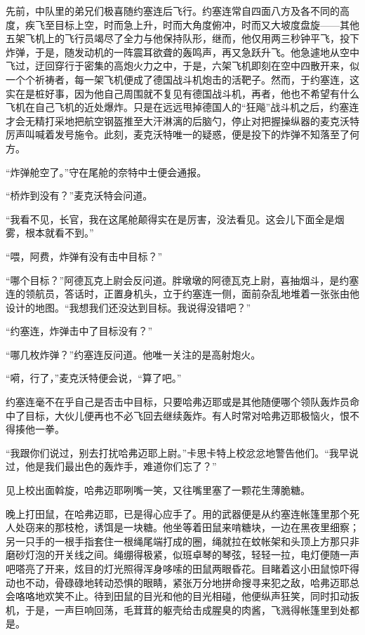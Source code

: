     先前，中队里的弟兄们极喜随约塞连后飞行。约塞连常自四面八方及各不同的高度，疾飞至目标上空，时而急上升，时而大角度俯冲，时而又大坡度盘旋——其他五架飞机上的飞行员竭尽了全力与他保持队形，继而，他仅用两三秒钟平飞，投下炸弹，于是，随发动机的一阵震耳欲聋的轰鸣声，再又急跃升飞。他急遽地从空中飞过，迂回穿行于密集的高炮火力之中，于是，六架飞机即刻在空中四散开来，似一个个祈祷者，每一架飞机便成了德国战斗机炮击的活靶子。然而，于约塞连，这实在是桩好事，因为他自己周围就不复见有德国战斗机，再者，他也不希望有什么飞机在自己飞机的近处爆炸。只是在远远甩掉德国人的“狂飚”战斗机之后，约塞连才会无精打采地把航空钢盔推至大汗淋漓的后脑勺，停止对把握操纵器的麦克沃特厉声叫喊着发号施令。此刻，麦克沃特唯一的疑惑，便是投下的炸弹不知落至了何方。

    “炸弹舱空了。”守在尾舱的奈特中士便会通报。

    “桥炸到没有？”麦克沃特会问道。

    “我看不见，长官，我在这尾舱颠得实在是厉害，没法看见。这会儿下面全是烟雾，根本就看不到。”

    “喂，阿费，炸弹有没有击中目标？”

    “哪个目标？”阿德瓦克上尉会反问道。胖墩墩的阿德瓦克上尉，喜抽烟斗，是约塞连的领航员，答话时，正置身机头，立于约塞连一侧，面前杂乱地堆着一张张由他设计的地图。“我想我们还没达到目标。我说得没错吧？”

    “约塞连，炸弹击中了目标没有？”

    “哪几枚炸弹？”约塞连反问道。他唯一关注的是高射炮火。

    “嗬，行了，”麦克沃特便会说，“算了吧。”

    约塞连毫不在乎自己是否击中目标，只要哈弗迈耶或是其他随便哪个领队轰炸员命中了目标，大伙儿便再也不必飞回去继续轰炸。有人时常对哈弗迈耶极恼火，恨不得揍他一拳。

    “我跟你们说过，别去打扰哈弗迈耶上尉。”卡思卡特上校忿忿地警告他们。“我早说过，他是我们最出色的轰炸手，难道你们忘了？”

    见上校出面斡旋，哈弗迈耶咧嘴一笑，又往嘴里塞了一颗花生薄脆糖。

    晚上打田鼠，在哈弗迈耶，已是得心应手了。用的武器便是从约塞连帐篷里那个死人处窃来的那枝枪，诱饵是一块糖。他坐等着田鼠来啃糖块，一边在黑夜里细察；另一只手的一根手指套住一根绳尾端打成的圈，绳就拉在蚊帐架和头顶上方那只非磨砂灯泡的开关线之间。绳绷得极紧，似班卓琴的琴弦，轻轻一拉，电灯便随一声吧嗒亮了开来，炫目的灯光照得浑身哆嗦的田鼠两眼昏花。目睹着这小田鼠惊吓得动也不动，骨碌碌地转动恐惧的眼睛，紧张万分地拼命搜寻来犯之敌，哈弗迈耶总会咯咯地欢笑不止。待到田鼠的目光和他的目光相碰，他便纵声狂笑，同时扣动扳机，于是，一声巨响回荡，毛茸茸的躯壳给击成腥臭的肉酱，飞溅得帐篷里到处都是。

